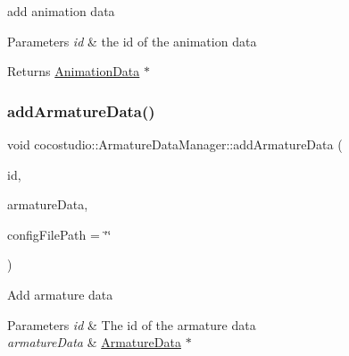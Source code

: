 add animation data 


\begin{DoxyParams}{Parameters}
{\em id} & the id of the animation data \\
\hline
\end{DoxyParams}
\begin{DoxyReturn}{Returns}
\hyperlink{classcocostudio_1_1AnimationData}{Animation\+Data} $\ast$ 
\end{DoxyReturn}
\mbox{\label{classcocostudio_1_1ArmatureDataManager_ad07ea60328afc77cd0787d6fc79ae519}} 
\subsubsection{\texorpdfstring{add\+Armature\+Data()}{addArmatureData()}\hspace{0.1cm}{\footnotesize\ttfamily [1/2]}}
{\footnotesize\ttfamily void cocostudio\+::\+Armature\+Data\+Manager\+::add\+Armature\+Data (\begin{DoxyParamCaption}\item[{const std\+::string \&}]{id,  }\item[{\hyperlink{classcocostudio_1_1ArmatureData}{Armature\+Data} $\ast$}]{armature\+Data,  }\item[{const std\+::string \&}]{config\+File\+Path = {\ttfamily \char`\"{}\char`\"{}} }\end{DoxyParamCaption})}

Add armature data 
\begin{DoxyParams}{Parameters}
{\em id} & The id of the armature data \\
\hline
{\em armature\+Data} & \hyperlink{classcocostudio_1_1ArmatureData}{Armature\+Data} $\ast$ \\
\hline
\end{DoxyParams}
\mbox{\label{classcocostudio_1_1ArmatureDataManager_ad07ea60328afc77cd0787d6fc79ae519}} 
